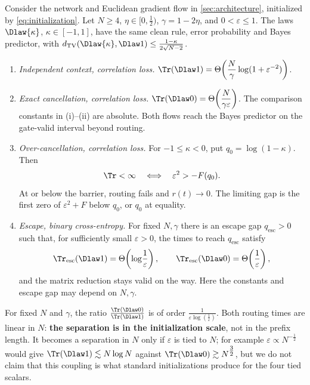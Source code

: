\begin{mainresult}
\begin{theorem}
\label{thm:separation}
Consider the network and Euclidean gradient flow in \cref{sec:architecture}, initialized by \cref{eq:initialization}.
Let $N\ge4$, $\eta\in[0,\tfrac{1}{2})$, $\gamma=1-2\eta$, and $0<\varepsilon\le1$.
The laws $\Dlaw{\kappa}$, $\kappa\in[-1,1]$, have the same clean rule, error probability and Bayes predictor,
with $d_{\mathrm{TV}}(\Dlaw{\kappa},\Dlaw1)\le\tfrac{1-\kappa}{2\sqrt{N-2}}$.
\begin{enumerate}[label=(\roman*),leftmargin=*,itemsep=2pt,topsep=2pt]
\item \emph{Independent context, correlation loss.}
$\displaystyle \Tr(\Dlaw1)=\Theta\!\left(\frac{N}{\gamma}\log(1+\varepsilon^{-2})\right)$.
\item \emph{Exact cancellation, correlation loss.}
$\displaystyle \Tr(\Dlaw0)=\Theta\!\left(\frac{N}{\gamma \varepsilon}\right)$.
The comparison constants in (i)--(ii) are absolute. Both flows reach the Bayes predictor on the gate-valid interval beyond routing.
\item \emph{Over-cancellation, correlation loss.}
For $-1\le \kappa<0$, put $q_0=\log(1-\kappa)$. Then
\[
 \Tr<\infty\quad\Longleftrightarrow\quad \varepsilon^2>-F(q_0).
\]
At or below the barrier, routing fails and $r(t)\to0$.
The limiting gap is the first zero of $\varepsilon^2+F$ below $q_0$, or $q_0$ at equality.
\item \emph{Escape, binary cross-entropy.}
For fixed $N,\gamma$ there is an escape gap $q_{\mathrm{esc}}>0$ such that, for sufficiently small $\varepsilon>0$,
the times to reach $q_{\mathrm{esc}}$ satisfy
\[
 \Tr_{\mathrm{esc}}(\Dlaw1)=\Theta\!\left(\log\!\frac{1}{\varepsilon}\right),\qquad
 \Tr_{\mathrm{esc}}(\Dlaw0)=\Theta\!\left(\frac{1}{\varepsilon}\right),
\]
and the matrix reduction stays valid on the way.
Here the constants and escape gap may depend on $N,\gamma$.
\end{enumerate}
\end{theorem}
\end{mainresult}

For fixed $N$ and $\gamma$, the ratio $\tfrac{\Tr(\Dlaw0)}{\Tr(\Dlaw1)}$ is of order $\tfrac{1}{\varepsilon\log(\tfrac{1}{\varepsilon})}$. Both routing times are
linear in $N$: \textbf{the separation is in the initialization scale}, not in the prefix length. It becomes a separation in $N$ only if $\varepsilon$ is tied to $N$;
for example $\varepsilon\propto N^{-\tfrac{1}{2}}$ would give $\Tr(\Dlaw1)\lesssim N\log N$ against $\Tr(\Dlaw0)\gtrsim N^{\tfrac{3}{2}}$, but we do not claim that this coupling
is what standard initializations produce for the four tied scalars.

